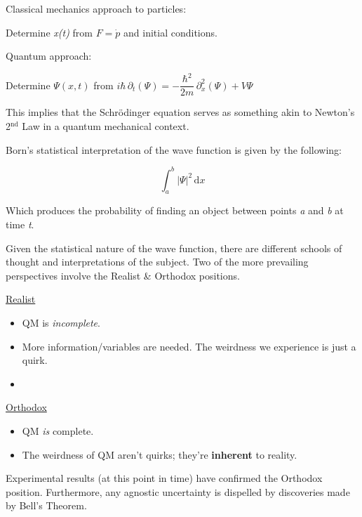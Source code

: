 Classical mechanics approach to particles:

Determine \textit{x(t)} from $F = \dot{p}$ and initial conditions.

\bigskip \bigskip

Quantum approach:

Determine $\Psi(x,t)$ from $i\hbar \, \partial_{t}(\Psi) =
- \dfrac{\hbar^{2}}{2m} \, \partial_{x}^{2}(\Psi)
+ V\Psi$

\bigskip

This implies that the Schrödinger equation serves as something akin to
Newton's 2$^{\text{nd}}$ Law in a quantum mechanical context.

\bigskip \bigskip

Born's statistical interpretation of the wave function is given by the
following:

\[
    \int_{a}^{b} |\Psi|^{2} \, \text{d}x
\]

Which produces the probability of finding an object between points
\textit{a} and \textit{b} at time \textit{t}.

\bigskip \bigskip

Given the statistical nature of the wave function, there are different schools
of thought and interpretations of the subject. Two of the more prevailing
perspectives involve the Realist \& Orthodox positions.

\bigskip

\underline{Realist}
\begin{itemize}[leftmargin = 0.5in]
    \item QM is \textit{incomplete}.
    \item More information/variables are needed. The weirdness we experience
          is just a quirk.
    \item
\end{itemize}

\bigskip

\underline{Orthodox}
\begin{itemize}[leftmargin = 0.5in]
    \item QM \textit{is} complete.
    \item The weirdness of QM aren't quirks; they're \textbf{inherent} to
          reality.
\end{itemize}

\bigskip

Experimental results (at this point in time) have confirmed the Orthodox
position. Furthermore, any agnostic uncertainty is dispelled by discoveries
made by Bell's Theorem.